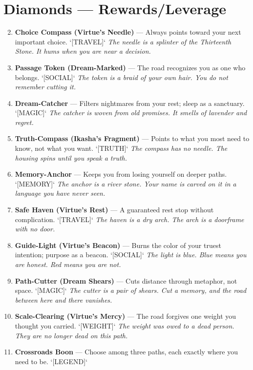 \section*{Diamonds --- Rewards/Leverage}
\label{sec:ways-between-rewards}
\begin{enumerate}
\setcounter{enumi}{1}
\item \textbf{Choice Compass (Virtue's Needle)} --- Always points toward your next important choice. `[TRAVEL]`
  \hfill \textit{The needle is a splinter of the Thirteenth Stone. It hums when you are near a decision.}
\item \textbf{Passage Token (Dream-Marked)} --- The road recognizes you as one who belongs. `[SOCIAL]`
  \hfill \textit{The token is a braid of your own hair. You do not remember cutting it.}
\item \textbf{Dream-Catcher} --- Filters nightmares from your rest; sleep as a sanctuary. `[MAGIC]`
  \hfill \textit{The catcher is woven from old promises. It smells of lavender and regret.}
\item \textbf{Truth-Compass (Ikasha's Fragment)} --- Points to what you most need to know, not what you want. `[TRUTH]`
  \hfill \textit{The compass has no needle. The housing spins until you speak a truth.}
\item \textbf{Memory-Anchor} --- Keeps you from losing yourself on deeper paths. `[MEMORY]`
  \hfill \textit{The anchor is a river stone. Your name is carved on it in a language you have never seen.}
\item \textbf{Safe Haven (Virtue's Rest)} --- A guaranteed rest stop without complication. `[TRAVEL]`
  \hfill \textit{The haven is a dry arch. The arch is a doorframe with no door.}
\item \textbf{Guide-Light (Virtue's Beacon)} --- Burns the color of your truest intention; purpose as a beacon. `[SOCIAL]`
  \hfill \textit{The light is blue. Blue means you are honest. Red means you are not.}
\item \textbf{Path-Cutter (Dream Shears)} --- Cuts distance through metaphor, not space. `[MAGIC]`
  \hfill \textit{The cutter is a pair of shears. Cut a memory, and the road between here and there vanishes.}
\item \textbf{Scale-Clearing (Virtue's Mercy)} --- The road forgives one weight you thought you carried. `[WEIGHT]`
  \hfill \textit{The weight was owed to a dead person. They are no longer dead on this path.}
\item[J] \textbf{Crossroads Boon} --- Choose among three paths, each exactly where you need to be. `[LEGEND]`

\end{enumerate}
